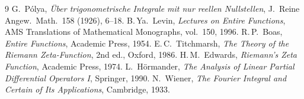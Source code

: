 \documentclass[11pt,a4paper]{article}
\theoremstyle{plain}
\theoremstyle{definition}
\theoremstyle{remark}
\begin{document}
\begin{thebibliography}{9}
G.~P\'olya, \emph{\"Uber trigonometrische Integrale mit nur reellen Nullstellen}, J.\ Reine Angew.\ Math.\ 158 (1926), 6--18.
B.\,Ya.~Levin, \emph{Lectures on Entire Functions}, AMS Translations of Mathematical Monographs, vol.~150, 1996.
R.\,P.~Boas, \emph{Entire Functions}, Academic Press, 1954.
E.\,C.~Titchmarsh, \emph{The Theory of the Riemann Zeta-Function}, 2nd ed., Oxford, 1986.
H.\,M.~Edwards, \emph{Riemann's Zeta Function}, Academic Press, 1974.
L.~H\"ormander, \emph{The Analysis of Linear Partial Differential Operators I}, Springer, 1990.
N.~Wiener, \emph{The Fourier Integral and Certain of Its Applications}, Cambridge, 1933.
\end{thebibliography}
\end{document}
